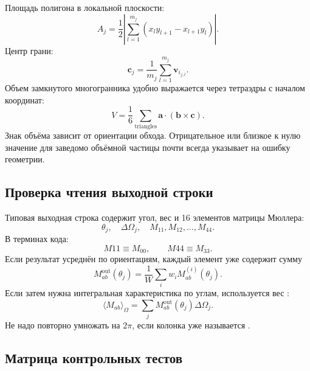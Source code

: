 \documentclass[11pt,a4paper]{article}
\newcommand{\code}[1]{\texttt{\small\detokenize{#1}}}
\newcommand{\vect}[1]{\symbf{#1}}
\begin{document}
Площадь полигона в локальной плоскости:
\[
  A_j=
  \frac12
  \left|
  \sum_{l=1}^{m_j}
  (x_l y_{l+1}-x_{l+1}y_l)
  \right|.
\]
Центр грани:
\[
  \vect c_j=
  \frac{1}{m_j}
  \sum_{l=1}^{m_j}\vect v_{i_{j,l}}.
\]
Объем замкнутого многогранника удобно выражается через тетраэдры с началом координат:
\[
  V=
  \frac16
  \sum_{\mathrm{triangles}}
  \vect a\cdot(\vect b\times\vect c).
\]
Знак объёма зависит от ориентации обхода. Отрицательное или близкое к нулю
значение для заведомо объёмной частицы почти всегда указывает на ошибку
геометрии.

\subsection{Проверка чтения выходной строки}

Типовая выходная строка содержит угол, вес и 16 элементов матрицы Мюллера:
\[
  \theta_j,\quad
  \Delta\Omega_j,\quad
  M_{11},M_{12},\ldots,M_{44}.
\]
В терминах кода:
\[
  M11 \equiv M_{00},\qquad
  M44 \equiv M_{33}.
\]
Если результат усреднён по ориентациям, каждый элемент уже содержит сумму
\[
  M_{ab}^{\mathrm{out}}(\theta_j)=
  \frac{1}{W}
  \sum_i w_i M_{ab}^{(i)}(\theta_j).
\]
Если затем нужна интегральная характеристика по углам, используется вес \code{2pi*dcos}:
\[
  \langle M_{ab}\rangle_{\Omega}
  =
  \sum_j
  M_{ab}^{\mathrm{out}}(\theta_j)
  \Delta\Omega_j.
\]
Не надо повторно умножать на $2\pi$, если колонка уже называется \code{2pi*dcos}.

\subsection{Матрица контрольных тестов}
\end{document}
